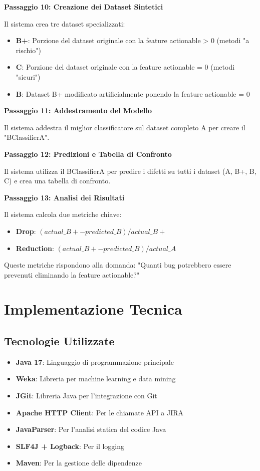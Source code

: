 \documentclass[12pt,a4paper]{article}
\begin{document}
\textbf{Passaggio 10: Creazione dei Dataset Sintetici}

Il sistema crea tre dataset specializzati:
\begin{itemize}
    \item \textbf{B+}: Porzione del dataset originale con la feature actionable > 0 (metodi "a rischio")
    \item \textbf{C}: Porzione del dataset originale con la feature actionable = 0 (metodi "sicuri")
    \item \textbf{B}: Dataset B+ modificato artificialmente ponendo la feature actionable = 0
\end{itemize}

\textbf{Passaggio 11: Addestramento del Modello}

Il sistema addestra il miglior classificatore sul dataset completo A per creare il "BClassifierA".

\textbf{Passaggio 12: Predizioni e Tabella di Confronto}

Il sistema utilizza il BClassifierA per predire i difetti su tutti i dataset (A, B+, B, C) e crea una tabella di confronto.

\textbf{Passaggio 13: Analisi dei Risultati}

Il sistema calcola due metriche chiave:
\begin{itemize}
    \item \textbf{Drop}: $(actual\_B+ - predicted\_B) / actual\_B+$
    \item \textbf{Reduction}: $(actual\_B+ - predicted\_B) / actual\_A$
\end{itemize}

Queste metriche rispondono alla domanda: "Quanti bug potrebbero essere prevenuti eliminando la feature actionable?"

\section{Implementazione Tecnica}

\subsection{Tecnologie Utilizzate}

\begin{itemize}
    \item \textbf{Java 17}: Linguaggio di programmazione principale
    \item \textbf{Weka}: Libreria per machine learning e data mining
    \item \textbf{JGit}: Libreria Java per l'integrazione con Git
    \item \textbf{Apache HTTP Client}: Per le chiamate API a JIRA
    \item \textbf{JavaParser}: Per l'analisi statica del codice Java
    \item \textbf{SLF4J + Logback}: Per il logging
    \item \textbf{Maven}: Per la gestione delle dipendenze
\end{itemize}
\end{document}

